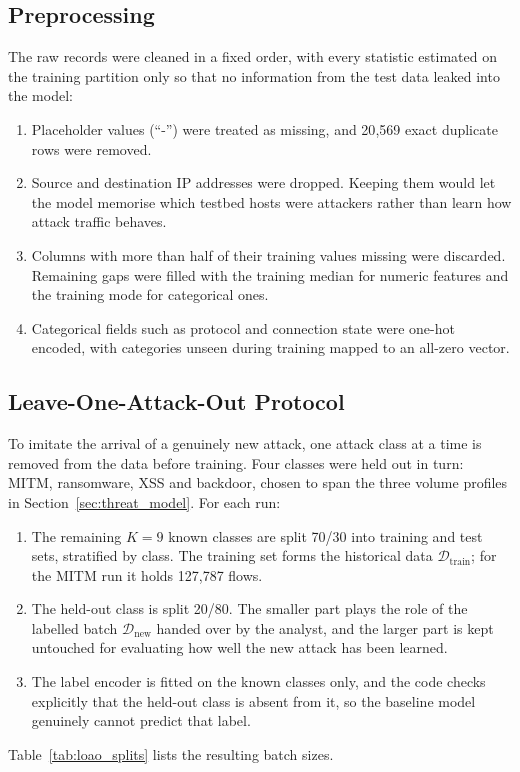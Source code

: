 \subsection{Preprocessing}
\label{subsec:preprocessing}

The raw records were cleaned in a fixed order, with every statistic estimated on the training partition only so that no information from the test data leaked into the model:
\begin{enumerate}
    \item Placeholder values (``-'') were treated as missing, and 20{,}569 exact duplicate rows were removed.
    \item Source and destination IP addresses were dropped. Keeping them would let the model memorise which testbed hosts were attackers rather than learn how attack traffic behaves.
    \item Columns with more than half of their training values missing were discarded. Remaining gaps were filled with the training median for numeric features and the training mode for categorical ones.
    \item Categorical fields such as protocol and connection state were one-hot encoded, with categories unseen during training mapped to an all-zero vector.
\end{enumerate}

\subsection{Leave-One-Attack-Out Protocol}
\label{subsec:loao}

To imitate the arrival of a genuinely new attack, one attack class at a time is removed from the data before training. Four classes were held out in turn: MITM, ransomware, XSS and backdoor, chosen to span the three volume profiles in Section~\ref{sec:threat_model}. For each run:
\begin{enumerate}
    \item The remaining $K = 9$ known classes are split 70/30 into training and test sets, stratified by class. The training set forms the historical data $\mathcal{D}_{\text{train}}$; for the MITM run it holds 127{,}787 flows.
    \item The held-out class is split 20/80. The smaller part plays the role of the labelled batch $\mathcal{D}_{\text{new}}$ handed over by the analyst, and the larger part is kept untouched for evaluating how well the new attack has been learned.
    \item The label encoder is fitted on the known classes only, and the code checks explicitly that the held-out class is absent from it, so the baseline model genuinely cannot predict that label.
\end{enumerate}
Table~\ref{tab:loao_splits} lists the resulting batch sizes.

